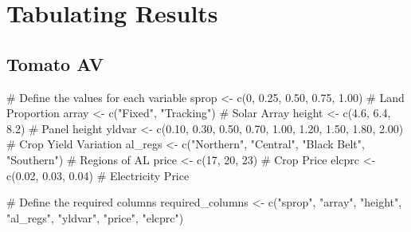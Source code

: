 \documentclass[
  letterpaper,
  DIV=11,
  numbers=noendperiod]{scrartcl}
\newenvironment{Shaded}{\begin{snugshade}}{\end{snugshade}}
\newcommand{\CommentTok}[1]{\textcolor[rgb]{0.37,0.37,0.37}{#1}}
\newcommand{\DecValTok}[1]{\textcolor[rgb]{0.68,0.00,0.00}{#1}}
\newcommand{\FloatTok}[1]{\textcolor[rgb]{0.68,0.00,0.00}{#1}}
\newcommand{\FunctionTok}[1]{\textcolor[rgb]{0.28,0.35,0.67}{#1}}
\newcommand{\NormalTok}[1]{\textcolor[rgb]{0.00,0.23,0.31}{#1}}
\newcommand{\OtherTok}[1]{\textcolor[rgb]{0.00,0.23,0.31}{#1}}
\newcommand{\StringTok}[1]{\textcolor[rgb]{0.13,0.47,0.30}{#1}}
\begin{document}
\section{Tabulating Results}\label{tabulating-results}

\subsection{Tomato AV}\label{tomato-av-1}

\begin{Shaded}
\begin{Highlighting}[]
\CommentTok{\# Define the values for each variable}
\NormalTok{sprop }\OtherTok{\textless{}{-}} \FunctionTok{c}\NormalTok{(}\DecValTok{0}\NormalTok{, }\FloatTok{0.25}\NormalTok{, }\FloatTok{0.50}\NormalTok{, }\FloatTok{0.75}\NormalTok{, }\FloatTok{1.00}\NormalTok{) }\CommentTok{\# Land Proportion}
\NormalTok{array }\OtherTok{\textless{}{-}} \FunctionTok{c}\NormalTok{(}\StringTok{"Fixed"}\NormalTok{, }\StringTok{"Tracking"}\NormalTok{) }\CommentTok{\# Solar Array}
\NormalTok{height }\OtherTok{\textless{}{-}} \FunctionTok{c}\NormalTok{(}\FloatTok{4.6}\NormalTok{, }\FloatTok{6.4}\NormalTok{, }\FloatTok{8.2}\NormalTok{) }\CommentTok{\# Panel height}
\NormalTok{yldvar }\OtherTok{\textless{}{-}} \FunctionTok{c}\NormalTok{(}\FloatTok{0.10}\NormalTok{, }\FloatTok{0.30}\NormalTok{, }\FloatTok{0.50}\NormalTok{, }\FloatTok{0.70}\NormalTok{, }\FloatTok{1.00}\NormalTok{, }\FloatTok{1.20}\NormalTok{, }\FloatTok{1.50}\NormalTok{, }\FloatTok{1.80}\NormalTok{, }\FloatTok{2.00}\NormalTok{) }\CommentTok{\# Crop Yield Variation}
\NormalTok{al\_regs }\OtherTok{\textless{}{-}} \FunctionTok{c}\NormalTok{(}\StringTok{"Northern"}\NormalTok{, }\StringTok{"Central"}\NormalTok{, }\StringTok{"Black Belt"}\NormalTok{, }\StringTok{"Southern"}\NormalTok{) }\CommentTok{\# Regions of AL}
\NormalTok{price }\OtherTok{\textless{}{-}} \FunctionTok{c}\NormalTok{(}\DecValTok{17}\NormalTok{, }\DecValTok{20}\NormalTok{, }\DecValTok{23}\NormalTok{) }\CommentTok{\# Crop Price}
\NormalTok{elcprc }\OtherTok{\textless{}{-}} \FunctionTok{c}\NormalTok{(}\FloatTok{0.02}\NormalTok{, }\FloatTok{0.03}\NormalTok{, }\FloatTok{0.04}\NormalTok{) }\CommentTok{\# Electricity Price}

\CommentTok{\# Define the required columns}
\NormalTok{required\_columns }\OtherTok{\textless{}{-}} \FunctionTok{c}\NormalTok{(}\StringTok{"sprop"}\NormalTok{, }\StringTok{"array"}\NormalTok{, }\StringTok{"height"}\NormalTok{, }
                      \StringTok{"al\_regs"}\NormalTok{, }\StringTok{"yldvar"}\NormalTok{, }\StringTok{"price"}\NormalTok{, }\StringTok{"elcprc"}\NormalTok{)}


\end{Highlighting}
\end{Shaded}
\end{document}
